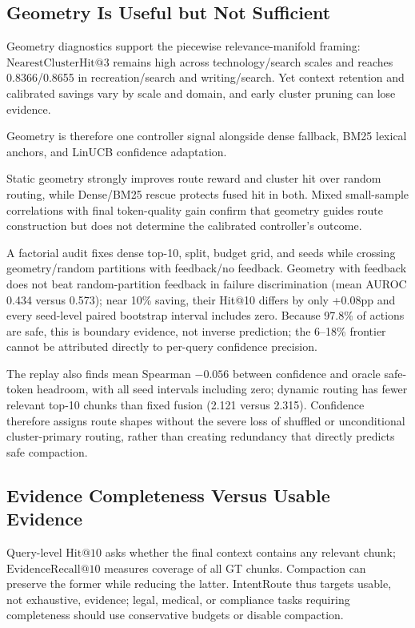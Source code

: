 \subsection{Geometry Is Useful but Not Sufficient}
\label{sec:07-discussion:geometry-is-useful-but-not-sufficient}

Geometry diagnostics support the piecewise relevance-manifold framing: $\mathrm{NearestClusterHit@3}$ remains high across technology/search scales and reaches 0.8366/0.8655 in recreation/search and writing/search. Yet context retention and calibrated savings vary by scale and domain, and early cluster pruning can lose evidence.

Geometry is therefore one controller signal alongside dense fallback, BM25 lexical anchors, and LinUCB confidence adaptation.

Static geometry strongly improves route reward and cluster hit over random routing, while Dense/BM25 rescue protects fused hit in both. Mixed small-sample correlations with final token-quality gain confirm that geometry guides route construction but does not determine the calibrated controller's outcome.

A factorial audit fixes dense top-10, split, budget grid, and seeds while crossing geometry/random partitions with feedback/no feedback. Geometry with feedback does not beat random-partition feedback in failure discrimination (mean AUROC 0.434 versus 0.573); near 10\% saving, their Hit@10 differs by only +0.08pp and every seed-level paired bootstrap interval includes zero. Because 97.8\% of actions are safe, this is boundary evidence, not inverse prediction; the 6--18\% frontier cannot be attributed directly to per-query confidence precision.

The replay also finds mean Spearman $-0.056$ between confidence and oracle safe-token headroom, with all seed intervals including zero; dynamic routing has fewer relevant top-10 chunks than fixed fusion (2.121 versus 2.315). Confidence therefore assigns route shapes without the severe loss of shuffled or unconditional cluster-primary routing, rather than creating redundancy that directly predicts safe compaction.

\subsection{Evidence Completeness Versus Usable Evidence}
\label{sec:07-discussion:evidence-completeness-versus-usable-evidence}

Query-level $\mathrm{Hit@10}$ asks whether the final context contains any relevant chunk; $\mathrm{EvidenceRecall@10}$ measures coverage of all GT chunks. Compaction can preserve the former while reducing the latter. IntentRoute thus targets usable, not exhaustive, evidence; legal, medical, or compliance tasks requiring completeness should use conservative budgets or disable compaction.


